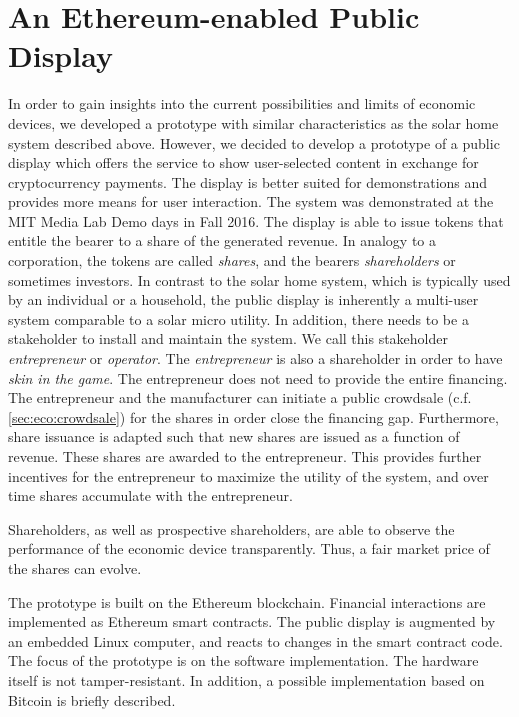\section{An Ethereum-enabled Public Display}
\label{sec:caseDisplay}

In order to gain insights into the current possibilities and limits of economic devices, we developed a prototype with similar characteristics as the solar home system described above. However, we decided to develop a prototype of a public display which offers the service to show user-selected content in exchange for cryptocurrency payments. The display is better suited for demonstrations and provides more means for user interaction. The system was demonstrated at the MIT Media Lab Demo days in Fall 2016. The display is able to issue tokens that entitle the bearer to a share of the generated revenue. In analogy to a corporation, the tokens are called \emph{shares}, and the bearers \emph{shareholders} or sometimes investors. In contrast to the solar home system, which is typically used by an individual or a household, the public display is inherently a multi-user system comparable to a solar micro utility. In addition, there needs to be a stakeholder to install and maintain the system. We call this stakeholder \emph{entrepreneur} or \emph{operator}. The \emph{entrepreneur} is also a shareholder in order to have \emph{skin in the game}. The entrepreneur does not need to provide the entire financing. The entrepreneur and the manufacturer can initiate a public crowdsale (c.f. \ref{sec:eco:crowdsale}) for the shares in order close the financing gap. Furthermore, share issuance is adapted such that new shares are issued as a function of revenue. These shares are awarded to the entrepreneur. This provides further incentives for the entrepreneur to maximize the utility of the system, and over time shares accumulate with the entrepreneur. 

Shareholders, as well as prospective shareholders, are able to observe the performance of the economic device transparently. Thus, a fair market price of the shares can evolve. 

The prototype is built on the Ethereum blockchain. Financial interactions are implemented as Ethereum smart contracts. The public display is augmented by an embedded Linux computer, and reacts to changes in the smart contract code. The focus of the prototype is on the software implementation. The hardware itself is not tamper-resistant. In addition, a possible implementation based on Bitcoin is briefly described.


